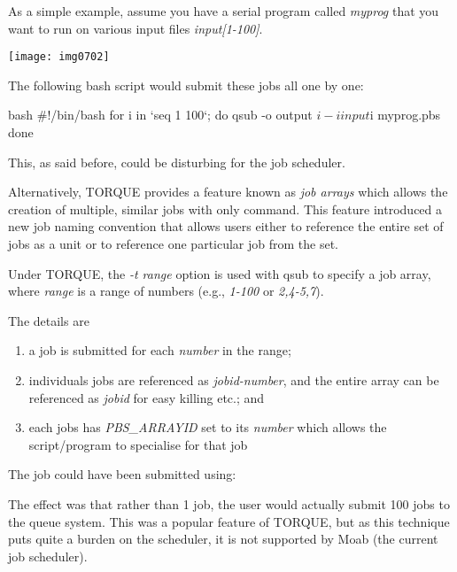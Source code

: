 \begin{prompt}
\end{prompt}

As a simple example, assume you have a serial program called \emph{myprog} that you
want to run on various input files \textit{input[1-100]}.

\texttt{[image: img0702]}

The following bash script would submit these jobs all one by one:
\begin{code}{bash}
#!/bin/bash
for i in `seq 1 100`; do
   qsub -o output $i -i input $i myprog.pbs
done
\end{code}

This, as said before, could be disturbing for the job scheduler.

Alternatively, TORQUE provides a feature known as \emph{job arrays} which
allows the creation of multiple, similar jobs with only 
command. This feature introduced a new job naming convention that allows users
either to reference the entire set of jobs as a unit or to reference one
particular job from the set.

Under TORQUE, the \emph{-t range} option is used with qsub to specify a job
array, where \emph{range} is a range of numbers (e.g., \emph{1-100} or
\emph{2,4-5,7}).

The details are

\begin{enumerate}
\item  a job is submitted for each \emph{number} in the range;
\item  individuals jobs are referenced as \emph{jobid-number}, and the entire array can be referenced as \emph{jobid} for easy killing etc.; and
\item  each jobs has \emph{PBS\_ARRAYID} set to its \emph{number} which allows the script/program to specialise for that job
\end{enumerate}

The job could have been submitted using:
\begin{prompt}
\end{prompt}

The effect was that rather than 1 job, the user would actually submit 100 jobs
to the queue system. This was a popular feature of TORQUE, but as this
technique puts quite a burden on the scheduler, it is not supported by Moab
(the current job scheduler).

